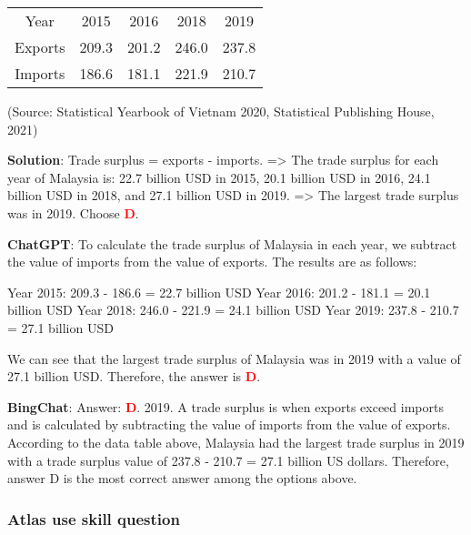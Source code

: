 \documentclass{article}
\begin{document}
{\begin{mdframed}[linewidth=1pt,linecolor=red]
		\begin{tabular}{ccccc}
			\multicolumn{1}{c}{Year} & 2015  & 2016  & 2018  & 2019   \\
			Exports                       & 209.3 & 201.2 & 246.0 & 237.8  \\
			Imports                       & 186.6 & 181.1 & 221.9 & 210.7  
		\end{tabular}
		
		(Source: Statistical Yearbook of Vietnam 2020, Statistical Publishing House, 2021)
		
		
		
		\begin{oneparchoices}
		\end{oneparchoices}
		
		\textbf{Solution}: Trade surplus = exports - imports. => The trade surplus for each year of Malaysia is: 22.7 billion USD in 2015, 20.1 billion USD in 2016, 24.1 billion USD in 2018, and 27.1 billion USD in 2019. => The largest trade surplus was in 2019.
		Choose \textcolor{red}{\textbf{D}}.
		
		\textbf{ChatGPT}: To calculate the trade surplus of Malaysia in each year, we subtract the value of imports from the value of exports. The results are as follows:
		
		Year 2015: 209.3 - 186.6 = 22.7 billion USD
		Year 2016: 201.2 - 181.1 = 20.1 billion USD
		Year 2018: 246.0 - 221.9 = 24.1 billion USD
		Year 2019: 237.8 - 210.7 = 27.1 billion USD
		
		We can see that the largest trade surplus of Malaysia was in 2019 with a value of 27.1 billion USD. Therefore, the answer is \textcolor{red}{\textbf{D}}.
		
		
		\textbf{BingChat}: Answer: \textcolor{red}{\textbf{D}}. 2019. A trade surplus is when exports exceed imports and is calculated by subtracting the value of imports from the value of exports. According to the data table above, Malaysia had the largest trade surplus in 2019 with a trade surplus value of 237.8 - 210.7 = 27.1 billion US dollars. Therefore, answer D is the most correct answer among the options above.
		
		
	\end{mdframed}	
	
	\subsubsection{Atlas use skill question}
	\label{VNHSGE_Geo_Atlas}
	
}
\end{document}
